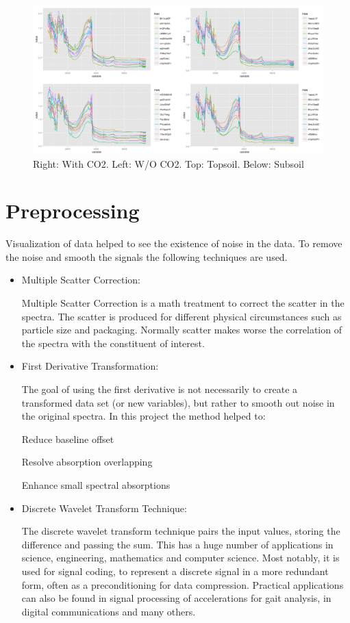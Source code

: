 \documentclass[12pt,letterpaper]{article}
\begin{document}
\begin{figure}[h!]
	\centering
	\includegraphics[width=\textwidth]{Rplot.png}
	\caption{\label{fig:Rplot} Right: With CO2. Left: W/O CO2. Top: Topsoil. Below: Subsoil}
\end{figure}

\section{Preprocessing}
Visualization of data helped to see the existence of noise in the data. To remove the noise and smooth the signals the following techniques are used.
\begin{itemize}
\item Multiple Scatter Correction:

	Multiple Scatter Correction is a math treatment to correct the scatter in the spectra. The scatter is produced for different physical circumstances such as particle size and packaging. Normally scatter makes worse the correlation of the spectra with the constituent of interest.
	
	\item First Derivative Transformation:
	
	The goal of using the first derivative is not necessarily to create a transformed data set (or new variables), but rather to smooth out noise in the original spectra. In this project the method helped to:
	
	Reduce baseline offset
	
	Resolve absorption overlapping
	
	Enhance small spectral absorptions
\item Discrete Wavelet Transform Technique:

The discrete wavelet transform technique pairs the input values, storing the difference and passing the sum. This has a huge number of applications in science, engineering, mathematics and computer science. Most notably, it is used for signal coding, to represent a discrete signal in a more redundant form, often as a preconditioning for data compression. Practical applications can also be found in signal processing of accelerations for gait analysis, in digital communications and many others. 

\end{itemize}
\end{document}
